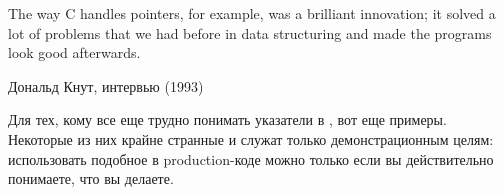 \myindex{\CLanguageElements!\Pointers}
\label{label_pointers}

\epigraph{The way C handles pointers, for example, was a brilliant innovation;
it solved a lot of problems that we had before in data structuring and
made the programs look good afterwards.}{Дональд Кнут, интервью (1993)}

Для тех, кому все еще трудно понимать указатели в \CCpp{}, вот еще примеры.
Некоторые из них крайне странные и служат только демонстрационным целям:
использовать подобное в production-коде можно только если вы действительно понимаете, что вы делаете.







%

% 

